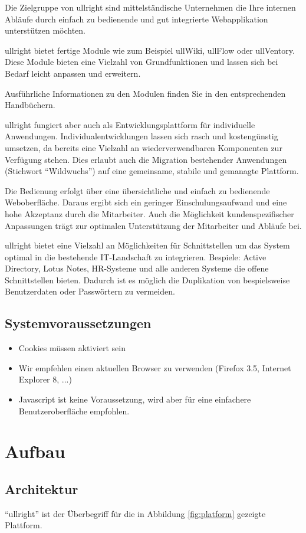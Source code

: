 \documentclass[article, a4paper, oneside, 11pt]{memoir}
\begin{document}
Die Zielgruppe von ullright sind mittelständische Unternehmen die Ihre internen Abläufe durch einfach zu bedienende und gut integrierte Webapplikation unterstützen möchten.

ullright bietet fertige Module wie zum Beispiel ullWiki, ullFlow oder ullVentory. Diese Module bieten eine Vielzahl von Grundfunktionen und lassen sich bei Bedarf leicht anpassen und erweitern.

Ausführliche Informationen zu den Modulen finden Sie in den entsprechenden Handbüchern.

ullright fungiert aber auch als Entwicklungsplattform für individuelle Anwendungen. Individualentwicklungen lassen sich rasch und kostengünstig umsetzen, da bereits eine Vielzahl an wiederverwendbaren Komponenten zur Verfügung stehen. Dies erlaubt auch die Migration bestehender Anwendungen (Stichwort "`Wildwuchs"') auf eine gemeinsame, stabile und gemanagte Plattform.

Die Bedienung erfolgt über eine übersichtliche und einfach zu bedienende Weboberfläche. Daraus ergibt sich ein geringer Einschulungsaufwand und eine hohe Akzeptanz durch die Mitarbeiter. Auch die Möglichkeit  kundenspezifischer Anpassungen trägt zur optimalen Unterstützung der Mitarbeiter und Abläufe bei.

ullright bietet eine Vielzahl an Möglichkeiten für Schnittstellen um das System optimal in die bestehende IT-Landschaft zu integrieren. Bespiele: Active Directory, Lotus Notes, HR-Systeme und alle anderen Systeme die offene Schnittstellen bieten. Dadurch ist es möglich die Duplikation von bespielsweise Benutzerdaten oder Passwörtern zu vermeiden.

\subsection{Systemvoraussetzungen}
\begin{itemize}
\item Cookies müssen aktiviert sein
\item Wir empfehlen einen aktuellen Browser zu verwenden (Firefox 3.5, Internet Explorer 8, ...)
\item Javascript ist keine Voraussetzung, wird aber für eine einfachere Benutzeroberfläche empfohlen.
\end{itemize}
\section{Aufbau}
\subsection{Architektur}
"`ullright"' ist der Überbegriff für die in Abbildung \vref{fig:platform} gezeigte Plattform.
\end{document}
